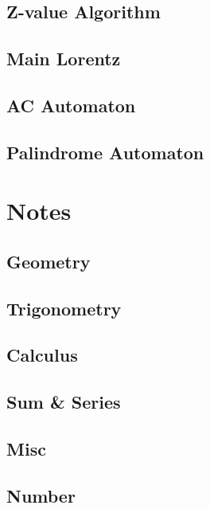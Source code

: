 \documentclass[a4paper,10pt,oneside]{article}
\newcommand{\makegrid}{
\clearpage

\begin{center}
    \begin{tikzpicture}
        \draw[step=1, gray, thin] (0,0) grid (20.0, 25.0);
    \end{tikzpicture}
\end{center}
}
\begin{document}
\subsection{Z-value Algorithm}


\subsection{Main Lorentz}


\subsection{AC Automaton}


\subsection{Palindrome Automaton}


\section{Notes}

\subsection{Geometry}


\subsection{Trigonometry}


\subsection{Calculus}


\subsection{Sum \& Series}


\subsection{Misc}


\subsection{Number}



\end{document}
